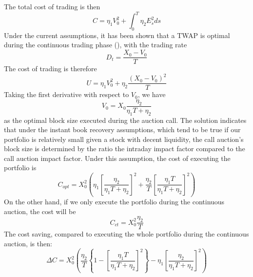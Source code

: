 \documentclass{article}
\begin{document}
The total cost of trading is then
\[
C =\eta_1  V_0^2 + \int_0^T \eta_2 E_s^2 ds
\]
Under the current assumptions, it has been shown that a TWAP is optimal during the continuous trading phase (\cite{AlmgrenChriss2000}), with the trading rate
\[
D_t = \frac{X_0 - V_0}{T}
\]
The cost of trading is therefore
\[
U = \eta_1 V_0^2 + \eta_2 \frac{(X_0 - V_0)^2}{T}
\]
Taking the first derivative with respect to $V_0$, we have 
\[
V_0= X_0 \frac{\eta_2}{\eta_1 T +\eta_2}
\]
as the optimal block size executed during the auction call. The solution indicates that under the instant book recovery assumptions, which tend to be true if our portfolio is relatively small given a stock with decent liquidity, the call auction's block size is determined by the ratio the intraday impact factor compared to the call auction impact factor. Under this assumption, the cost of executing the portfolio is
\[
C_{opt}  = X_0^2\left(\eta_1  \left[\frac{\eta_2}{\eta_1 T + \eta_2}\right]^2 + \frac{\eta_2}{T}  \left[\frac{\eta_1 T}{\eta_1 T + \eta_2}\right]^2 \right)
\]
On the other hand, if we only execute the portfolio during the continuous auction, the cost will be
\[
C_{ct} =  X_0^2 \frac{\eta_2}{T}
\]
The cost saving, compared to executing the whole portfolio during the continuous auction, is then:
\[
\Delta C = X_0^2\left(\frac{\eta_2}{T}  \left\{1 - \left[ \frac{\eta_1 T}{\eta_1 T + \eta_2}\right]^2\right\} - \eta_1  \left[\frac{\eta_2}{\eta_1 T + \eta_2}\right]^2\right)
\]
\end{document}
